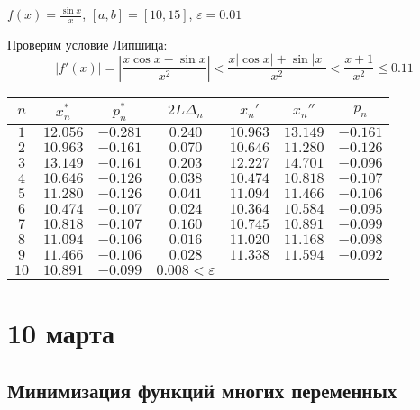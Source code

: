 \begin{example}
    \(f(x) = \frac{\sin x}{x} \), \([a, b] = [10, 15]\), \(\varepsilon = 0.01\)

    Проверим условие Липшица:
    \[|f'(x)| = \left|\frac{x\cos x - \sin x}{x^2} \right| < \frac{x |\cos x| + \sin |x|}{x^2} < \frac{x + 1}{x^2} \leq 0.11\]

    \begin{tabular}{c|c|c|c|c|c|c}
        \(n\)  & \(x_n^*\)  & \(p_n^*\)    & \(2L \Delta_n\)         & \(x_n'\)   & \(x_n''\)  & \(p_n\)      \\ \hline
        \(1\)  & \(12.056\) & \( - 0.281\) & \(0.240\)               & \(10.963\) & \(13.149\) & \( - 0.161\) \\
        \(2\)  & \(10.963\) & \( - 0.161\) & \(0.070\)               & \(10.646\) & \(11.280\) & \( - 0.126\) \\
        \(3\)  & \(13.149\) & \( - 0.161\) & \(0.203\)               & \(12.227\) & \(14.701\) & \( - 0.096\) \\
        \(4\)  & \(10.646\) & \( - 0.126\) & \(0.038\)               & \(10.474\) & \(10.818\) & \( - 0.107\) \\
        \(5\)  & \(11.280\) & \( - 0.126\) & \(0.041\)               & \(11.094\) & \(11.466\) & \( - 0.106\) \\
        \(6\)  & \(10.474\) & \( - 0.107\) & \(0.024\)               & \(10.364\) & \(10.584\) & \( - 0.095\) \\
        \(7\)  & \(10.818\) & \( - 0.107\) & \(0.160\)               & \(10.745\) & \(10.891\) & \( - 0.099\) \\
        \(8\)  & \(11.094\) & \( - 0.106\) & \(0.016\)               & \(11.020\) & \(11.168\) & \( - 0.098\) \\
        \(9\)  & \(11.466\) & \( - 0.106\) & \(0.028\)               & \(11.338\) & \(11.594\) & \( - 0.092\) \\
        \(10\) & \(10.891\) & \( - 0.099\) & \(0.008 < \varepsilon\) &            &            &              \\
    \end{tabular}
\end{example}

\chapter{10 марта}

\section{Минимизация функций многих переменных}


